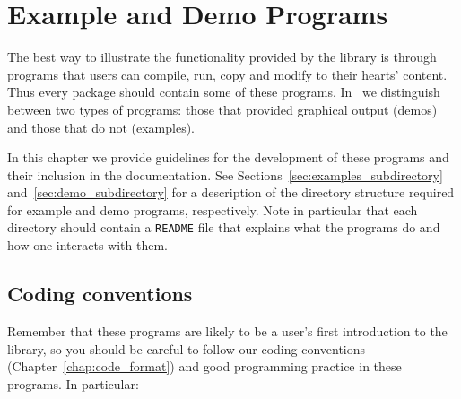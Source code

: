 \chapter{Example and Demo Programs\label{chap:examples_and_demos}}

The best way to illustrate the functionality provided by the library
is through programs that users can compile, run, copy and modify to
their hearts' content.  Thus every package should contain some of
these programs.  In \cgal\ we distinguish between two types of
programs:  those that provided graphical output (demos) and those that
do not (examples).

In this chapter we provide guidelines for the development
of these programs and their inclusion in the documentation.  See
Sections~\ref{sec:examples_subdirectory} and~\ref{sec:demo_subdirectory}
for a description of the directory structure required for example and
demo programs, respectively. Note in particular that each directory
should contain a \texttt{README} file that explains what the programs do and
how one interacts with them.

\section{Coding conventions\label{sec:ex_and_demo_coding}}

Remember that these programs are likely to be a user's first introduction
to the library, so you should be careful to follow our coding conventions 
(Chapter~\ref{chap:code_format}) and good programming practice in these 
programs.  In particular:

